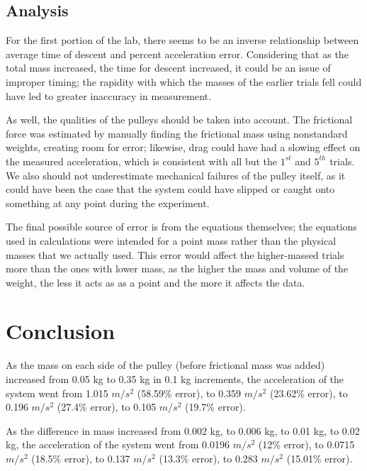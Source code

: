 \documentclass[11pt, titlepage]{article}
\begin{document}
\subsection*{Analysis}
For the first portion of the lab, there seems to be an inverse relationship between average time of descent and percent acceleration error. Considering that as the total mass increased, the time for descent increased, it could be an issue of improper timing; the rapidity with which the masses of the earlier trials fell could have led to greater inaccuracy in measurement.

As well, the qualities of the pulleys should be taken into account. The frictional force was estimated by manually finding the frictional mass using nonstandard weights, creating room for error; likewise, drag could have had a slowing effect on the measured acceleration, which is consistent with all but the $1^{st}$ and $5^{th}$ trials. We also should not underestimate mechanical failures of the pulley itself, as it could have been the case that the system could have slipped or caught onto something at any point during the experiment.

The final possible source of error is from the equations themselves; the equations used in calculations were intended for a point mass rather than the physical masses that we actually used. This error would affect the higher-massed trials more than the ones with lower mass, as the higher the mass and volume of the weight, the less it acts as as a point and the more it affects the data.

\section*{Conclusion}
As the mass on each side of the pulley (before frictional mass was added) increased from 0.05 kg to 0.35 kg in 0.1 kg increments, the acceleration of the system went from 1.015 $m/s^2$ (58.59\% error), to 0.359 $m/s^2$ (23.62\% error), to 0.196 $m/s^2$ (27.4\% error), to 0.105 $m/s^2$ (19.7\% error).

As the difference in mass increased from 0.002 kg, to 0.006 kg, to 0.01 kg, to 0.02 kg, the acceleration of the system went from 0.0196 $m/s^2$ (12\% error), to 0.0715 $m/s^2$ (18.5\% error), to 0.137 $m/s^2$ (13.3\% error), to 0.283 $m/s^2$ (15.01\% error). 
\end{document}
